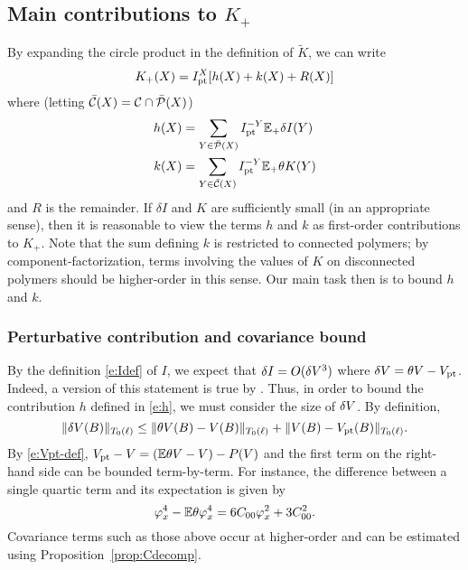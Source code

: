 
\subsection{Main contributions to \texorpdfstring{$K_+$}{K+}}

By expanding the circle product in the definition of $\tilde K$, we can write
\begin{equation}
K_+(X) = I_{\rm pt}^X [h(X) + k(X) + R(X)]
\end{equation}
where (letting $\bar{\mathcal{C}}(X) = \mathcal{C}\cap\bar{\mathcal{P}}(X)$)
\begin{align}
\label{e:hpt}
h(X)
	&=
\sum_{Y\in\bar{\mathcal{P}}(X)} I_{\rm pt}^{-Y} \mathbb{E}_+ \delta I(Y) \\
\label{e:k}
k(X)
	&=
\sum_{Y\in\bar{\mathcal{C}}(X)} I_{\rm pt}^{-Y} \mathbb{E}_+ \theta K(Y)
\end{align}
and $R$ is the remainder. If $\delta I$ and $K$ are sufficiently small (in an
appropriate sense), then it is reasonable to view the terms $h$ and $k$ as
first-order contributions to $K_+$. Note that the sum defining $k$ is restricted
to connected polymers; by component-factorization, terms involving the values
of $K$ on disconnected polymers should be higher-order in this sense.
Our main task then is to bound $h$ and $k$.

\subsubsection{Perturbative contribution and covariance bound}

By the definition \eqref{e:Idef} of $I$, we expect that $\delta I = O(\delta V^3)$
where $\delta V = \theta V - V_{\rm pt}$. Indeed, a version of this statement is true
by \cite[Proposition~\ref{IE-prop:ip}]{BS-rg-IE}.
Thus, in order to bound the contribution $h$ defined in \eqref{e:h}, we must consider
the size of $\delta V$. By definition,
\begin{equation}
\|\delta V(B)\|_{T_0(\ell)}
	\le
\|\theta V(B) - V(B)\|_{T_0(\ell)} + \|V(B) - V_{\rm pt}(B)\|_{T_0(\ell)}.
\end{equation}
By \eqref{e:Vpt-def}, $V_{\rm pt} - V = (\mathbb{E} \theta V - V) - P(V)$ and
the first term on the right-hand side can be bounded term-by-term. For
instance, the difference between a single quartic term and its expectation
is given by
\begin{equation}
\varphi_x^4 - \mathbb{E} \theta\varphi_x^4
	=
6 C_{00} \varphi_x^2 + 3 C_{00}^2.
\end{equation}
Covariance terms such as those above occur at higher-order and can be
estimated using Proposition~\ref{prop:Cdecomp}.

